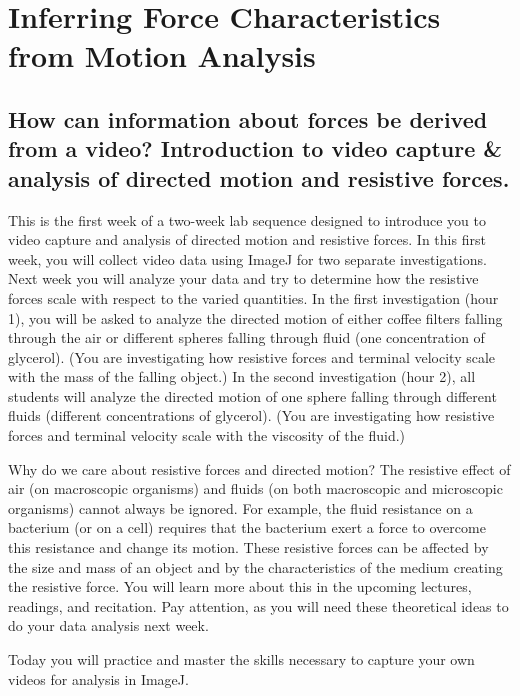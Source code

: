 \chapter{Inferring Force Characteristics from Motion Analysis}
\thispagestyle{fancy}
%
\section{How can information about forces be derived from a video? Introduction to video capture \& analysis of directed motion and resistive forces.}
This is the first week of a two-week lab sequence designed to introduce you to video capture and analysis of directed motion and resistive forces.
In this first week, you will collect video data using ImageJ for two separate investigations.
Next week you will analyze your data and try to determine how the resistive forces scale with respect to the varied quantities.
In the first investigation (hour 1), you will be asked to analyze the directed motion of either coffee filters falling through the air or different spheres falling through fluid (one concentration of glycerol).
(You are investigating how resistive forces and terminal velocity scale with the mass of the falling object.)
In the second investigation (hour 2), all students will analyze the directed motion of one sphere falling through different fluids (different concentrations of glycerol).
(You are investigating how resistive forces and terminal velocity scale with the viscosity of the fluid.) 
\par
Why do we care about resistive forces and directed motion?
The resistive effect of air (on macroscopic organisms) and fluids (on both macroscopic and microscopic organisms) cannot always be ignored.
For example, the fluid resistance on a bacterium (or on a cell) requires that the bacterium exert a force to overcome this resistance and change its motion.
These resistive forces can be affected by the size and mass of an object and by the characteristics of the medium creating the resistive force.
You will learn more about this in the upcoming lectures, readings, and recitation. Pay attention, as you will need these theoretical ideas to do your data analysis next week. 
\par 
Today you will practice and master the skills necessary to capture your own videos for analysis in ImageJ. 
